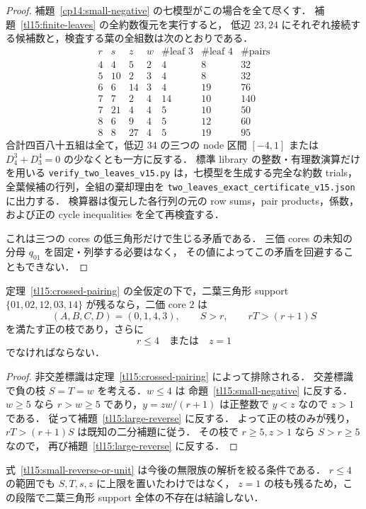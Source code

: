 \begin{proof}
補題~\ref{cp14:small-negative} の七模型がこの場合を全て尽くす．
補題~\ref{tl15:finite-leaves} の全約数復元を実行すると，
低辺 $23,24$ にそれぞれ接続する候補数と，検査する葉の全組数は次のとおりである．
\[
\begin{array}{rrrr|rr|r}
 r&s&z&w&\#\text{leaf }3&\#\text{leaf }4&\#\text{pairs}\\\hline
 4&4&5&2&4&8&32\\
 5&10&2&3&4&8&32\\
 6&6&14&3&4&19&76\\
 7&7&2&4&14&10&140\\
 7&21&4&4&5&10&50\\
 8&6&9&4&5&12&60\\
 8&8&27&4&5&19&95
\end{array}
\]
合計四百八十五組は全て，低辺 $34$ の三つの node 区間
$[-4,1]$ または $D^3_4+D^4_3=0$ の少なくとも一方に反する．
標準 library の整数・有理数演算だけを用いる
\nolinkurl{verify_two_leaves_v15.py} は，七模型を生成する完全な約数 trials，
全葉候補の行列，全組の棄却理由を
\nolinkurl{two_leaves_exact_certificate_v15.json} に出力する．
検算器は復元した各行列の元の row sums，pair products，係数，
および正の cycle inequalities を全て再検査する．

これは三つの cores の低三角形だけで生じる矛盾である．
三価 cores の未知の分母 $q_{01}$ を固定・列挙する必要はなく，
その値によってこの矛盾を回避することもできない．
\end{proof}

\begin{theorem}
\label{tl15:remaining-positive}
定理~\ref{tl15:crossed-pairing} の全仮定の下で，二葉三角形 support
$\{01,02,12,03,14\}$ が残るなら，二価 core $2$ は
\[
 (A,B,C,D)=(0,1,4,3),\qquad S>r,\qquad rT>(r+1)S
\]
を満たす正の枝であり，さらに
\begin{equation}\label{tl15:small-reverse-or-unit}
 r\le4\quad\text{または}\quad z=1
\end{equation}
でなければならない．
\end{theorem}

\begin{proof}
非交差標識は定理~\ref{tl15:crossed-pairing} によって排除される．
交差標識で負の枝 $S=T=w$ を考える．$w\le4$ は
命題~\ref{tl15:small-negative} に反する．$w\ge5$ なら
$r>w\ge5$ であり，$y=zw/(r+1)$ は正整数で $y<z$ なので $z>1$ である．
従って補題~\ref{tl15:large-reverse} に反する．
よって正の枝のみが残り，$rT>(r+1)S$ は既知の二分補題に従う．
その枝で $r\ge5,z>1$ なら $S>r\ge5$ なので，
再び補題~\ref{tl15:large-reverse} に反する．
\end{proof}

式~\eqref{tl15:small-reverse-or-unit} は今後の無限族の解析を絞る条件である．
$r\le4$ の範囲でも $S,T,s,z$ に上限を置いたわけではなく，
$z=1$ の枝も残るため，この段階で二葉三角形 support 全体の不存在は結論しない．
